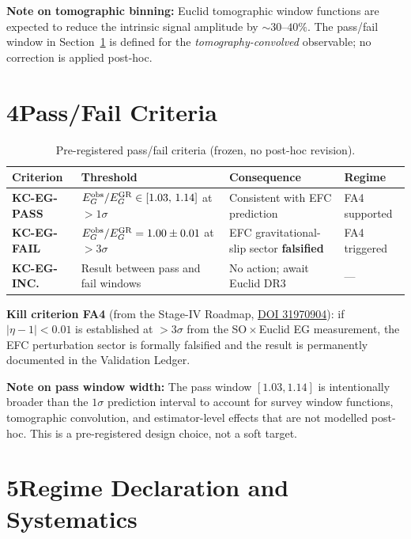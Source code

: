 \documentclass[11pt]{article}
\begin{document}
\textbf{Note on tomographic binning:} Euclid tomographic window
functions are expected to reduce the intrinsic signal amplitude
by $\sim 30$--$40\%$. The pass/fail window in
Section~\ref{sec:criteria} is defined for the \emph{tomography-convolved}
observable; no correction is applied post-hoc.

\section{4\quad Pass/Fail Criteria}
\label{sec:criteria}

\begin{table}[!ht]
\centering
\caption{Pre-registered pass/fail criteria (frozen, no post-hoc revision).}
\vspace{4pt}
\begin{tabular}{@{}lp{5.0cm}p{4.3cm}p{2.0cm}@{}}
\toprule
Criterion & Threshold & Consequence & Regime \\
\midrule
\textbf{KC-EG-PASS} &
  $E_G^{\rm obs}/E_G^{\rm GR} \in [1.03,\,1.14]$ at $> 1\sigma$ &
  Consistent with EFC prediction & FA4 supported \\[4pt]
\textbf{KC-EG-FAIL} &
  $E_G^{\rm obs}/E_G^{\rm GR} = 1.00 \pm 0.01$ at $> 3\sigma$ &
  EFC gravitational-slip sector \textbf{falsified} & FA4 triggered \\[4pt]
\textbf{KC-EG-INC.} &
  Result between pass and fail windows &
  No action; await Euclid DR3 & --- \\
\bottomrule
\end{tabular}
\label{tab:criteria}
\end{table}

\textbf{Kill criterion FA4} (from the Stage-IV Roadmap,
\href{https://doi.org/10.6084/m9.figshare.31970904}{DOI 31970904}):
if $|\eta - 1| < 0.01$ is established at $> 3\sigma$ from the
SO\,$\times$\,Euclid EG measurement, the EFC perturbation sector
is formally falsified and the result is permanently documented
in the Validation Ledger.

\textbf{Note on pass window width:} The pass window $[1.03, 1.14]$
is intentionally broader than the $1\sigma$ prediction interval
to account for survey window functions, tomographic convolution,
and estimator-level effects that are not modelled post-hoc.
This is a pre-registered design choice, not a soft target.

\section{5\quad Regime Declaration and Systematics}
\end{document}
